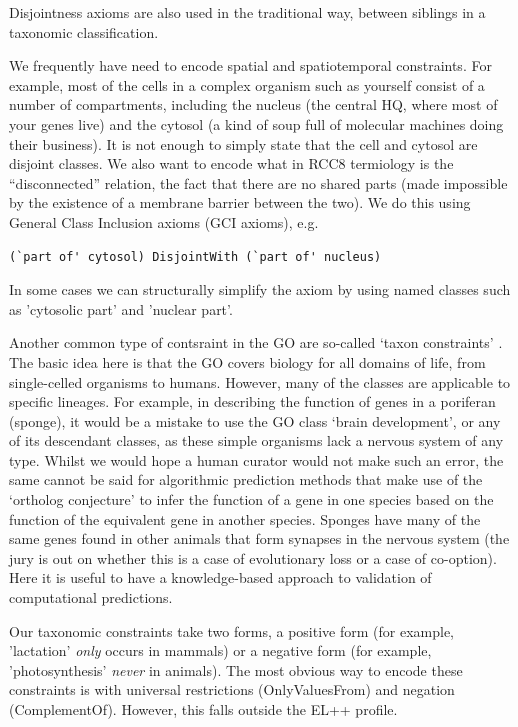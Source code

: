 \documentclass{llncs}
\begin{document}
Disjointness axioms are also used in the traditional way, between
siblings in a taxonomic classification.

We frequently have need to encode spatial and spatiotemporal
constraints. For example, most of the cells in a complex organism such
as yourself consist of a number of compartments, including the nucleus
(the central HQ, where most of your genes live) and the cytosol (a
kind of soup full of molecular machines doing their business). It is
not enough to simply state that the cell and cytosol are disjoint
classes. We also want to encode what in RCC8 termiology is the
``disconnected'' relation, the fact that there are no shared parts
(made impossible by the existence of a membrane barrier between the
two). We do this using General Class Inclusion axioms (GCI axioms),
e.g.  

\begin{verbatim}
(`part of' cytosol) DisjointWith (`part of' nucleus)
\end{verbatim}

In some cases we can structurally simplify the axiom by using named
classes such as 'cytosolic part' and 'nuclear part'.

Another common type of contsraint in the GO are so-called `taxon
constraints' \cite{Deegan2010}. The basic idea here is that the GO
covers biology for all domains of life, from single-celled organisms
to humans. However, many of the classes are applicable to specific
lineages. For example, in describing the function of genes in a
poriferan (sponge), it would be a mistake to use the GO class ‘brain
development’, or any of its descendant classes, as these simple
organisms lack a nervous system of any type. Whilst we would hope a
human curator would not make such an error, the same cannot be said
for algorithmic prediction methods that make use of the `ortholog
conjecture'\cite{Thomas2012} to infer the function of a gene in one
species based on the function of the equivalent gene in another
species. Sponges have many of the same genes found in other animals
that form synapses in the nervous system (the jury is out on whether
this is a case of evolutionary loss or a case of co-option). Here it
is useful to have a knowledge-based approach to validation of
computational predictions.

Our taxonomic constraints take two forms, a positive form (for
example, 'lactation' \emph{only} occurs in mammals) or a negative form
(for example, 'photosynthesis' \emph{never} in animals). The most
obvious way to encode these constraints is with universal restrictions
(OnlyValuesFrom) and negation (ComplementOf). However, this falls
outside the EL++ profile.
\end{document}

